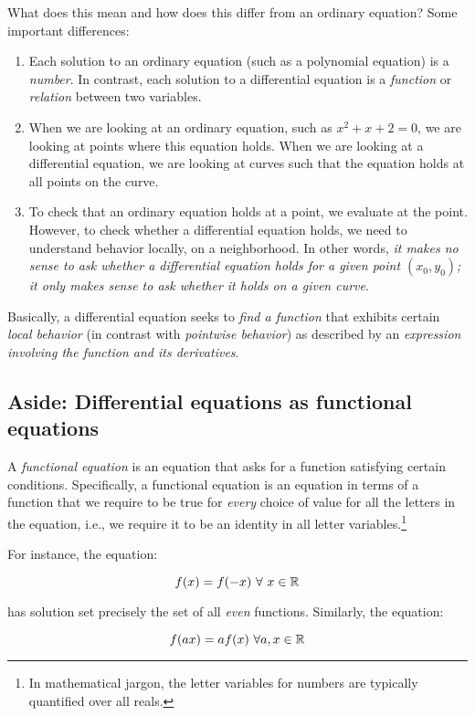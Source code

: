 \documentclass{amsart}
\begin{document}
What does this mean and how does this differ from an ordinary
equation? Some important differences:

\begin{enumerate}
\item Each solution to an ordinary equation (such as a polynomial
  equation) is a {\em number}. In contrast, each solution to a
  differential equation is a {\em function} or {\em relation} between
  two variables.
\item When we are looking at an ordinary equation, such as $x^2 + x +
  2 = 0$, we are looking at points where this equation holds. When we
  are looking at a differential equation, we are looking at curves
  such that the equation holds at all points on the curve.
\item To check that an ordinary equation holds at a point, we evaluate
  at the point. However, to check whether a differential equation
  holds, we need to understand behavior locally, on a neighborhood. In
  other words, {\em it makes no sense to ask whether a differential
  equation holds for a given point $(x_0,y_0)$; it only makes sense to
  ask whether it holds on a given curve}.
\end{enumerate}

Basically, a differential equation seeks to {\em find a function} that
exhibits certain {\em local behavior} (in contrast with {\em pointwise
behavior}) as described by an {\em expression involving the function
and its derivatives}.

\subsection*{Aside: Differential equations as functional equations}

A {\em functional equation} is an equation that asks for a function
satisfying certain conditions. Specifically, a functional equation is
an equation in terms of a function that we require to be true for {\em
every} choice of value for all the letters in the equation, i.e., we
require it to be an identity in all letter variables.\footnote{In mathematical
jargon, the letter variables for numbers are typically quantified over
all reals.}

For instance, the equation:

$$f(x) = f(-x) \ \forall \ x \in \mathbb{R}$$

has solution set precisely the set of all {\em even}
functions. Similarly, the equation:

$$f(ax) = af(x) \ \forall a,x \in \mathbb{R}$$
\end{document}
